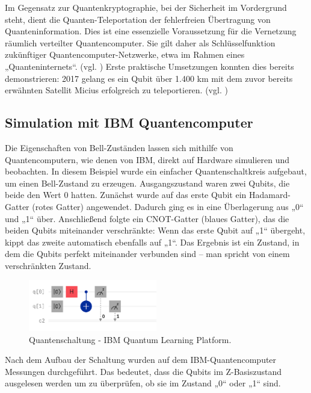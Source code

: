Im Gegensatz zur Quantenkryptographie, bei der Sicherheit im Vordergrund steht, dient die Quanten-Teleportation der fehlerfreien Übertragung von Quanteninformation. Dies ist eine essenzielle Voraussetzung für die Vernetzung räumlich verteilter Quantencomputer. Sie gilt daher als Schlüsselfunktion zukünftiger Quantencomputer-Netzwerke, etwa im Rahmen eines „Quanteninternets“. (vgl. \cite{Entanglement Distribution}) Erste praktische Umsetzungen konnten dies bereits demonstrieren: 2017 gelang es ein Qubit über 1.400 km mit dem zuvor bereits erwähnten Satellit Micius erfolgreich zu teleportieren. (vgl. \cite{Ground-to-satellite })


\subsection{Simulation mit IBM Quantencomputer}
Die Eigenschaften von Bell-Zuständen lassen sich mithilfe von Quantencomputern, wie denen von IBM, direkt auf Hardware simulieren und beobachten. In diesem Beispiel wurde ein einfacher Quantenschaltkreis aufgebaut, um einen Bell-Zustand zu erzeugen. Ausgangszustand waren zwei Qubits, die beide den Wert 0 hatten. Zunächst wurde auf das erste Qubit ein Hadamard-Gatter (rotes Gatter) angewendet. Dadurch ging es in eine Überlagerung aus „0“ und „1“ über. Anschließend folgte ein CNOT-Gatter (blaues Gatter), das die beiden Qubits miteinander verschränkte: Wenn das erste Qubit auf „1“ übergeht, kippt das zweite automatisch ebenfalls auf „1“. Das Ergebnis ist ein Zustand, in dem die Qubits perfekt miteinander verbunden sind – man spricht von einem verschränkten Zustand. 

\begin{figure}[h]
    \centering
    \includegraphics[width=0.5\textwidth]{images/Schaltung_IBM.png}
    \caption{Quantenschaltung - IBM Quantum Learning Platform.}
    \label{fig:meinbild}
\end{figure}

Nach dem Aufbau der Schaltung wurden auf dem IBM-Quantencomputer Messungen durchgeführt. Das bedeutet, dass die Qubits im Z-Basiszustand ausgelesen werden um zu überprüfen, ob sie im Zustand „0“ oder „1“ sind. 

